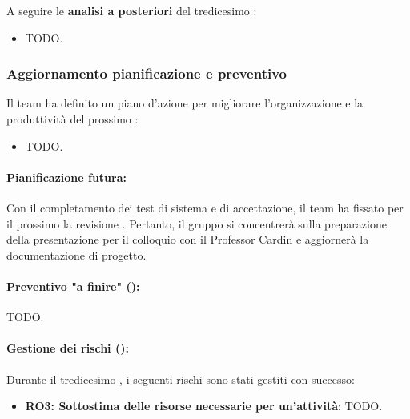 \vspace{0.5\baselineskip}
\par A seguire le \textbf{analisi a posteriori} del tredicesimo :
\begin{itemize}
  \item TODO.
\end{itemize}

\subsubsection{Aggiornamento pianificazione e preventivo}
\par Il team ha definito un piano d'azione per migliorare l'organizzazione e la produttività del prossimo :
\begin{itemize}
  \item TODO.
\end{itemize}

\paragraph*{Pianificazione futura:}
\par Con il completamento dei test di sistema e di accettazione, il team ha fissato per il prossimo  la revisione . Pertanto, il gruppo si concentrerà sulla preparazione della presentazione per il colloquio con il Professor Cardin e aggiornerà la documentazione di progetto.

\paragraph*{Preventivo "a finire" ():}
\par TODO.

\paragraph*{Gestione dei rischi ():}
\par Durante il tredicesimo , i seguenti rischi sono stati gestiti con successo:
\begin{itemize}
  \item \textbf{RO3: Sottostima delle risorse necessarie per un'attività}: TODO.
\end{itemize}

